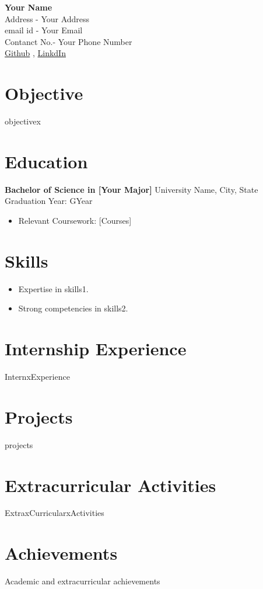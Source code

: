 \documentclass[a4paper,10pt]{article}
\newcommand{\resitem}[2]{
    \textbf{#1} \hfill {#2} \\
}
\begin{document}
\begin{center}
    {\LARGE \textbf{Your Name}} \\[0.2cm]
    Address - Your Address \\
    email id - Your Email \\
    Contanct No.-  Your Phone Number \\
    \href{https://github.com/Github Profile}{Github} , \href{https://www.linkedin.com/in/LinkedIn Profile}{LinkdIn}
\end{center}

\section*{Objective}
objectivex


\section*{Education}
\resitem{Bachelor of Science in [Your Major]}{University Name, City, State \\ Graduation Year: GYear}
\begin{itemize}[left=0pt]
    \item Relevant Coursework: [Courses]
\end{itemize}

\section*{Skills}
\begin{itemize}
    \item Expertise in skills1.
    \item Strong competencies in skills2.
\end{itemize}

\section*{Internship Experience}
InternxExperience

\section*{Projects}
projects

\section*{Extracurricular Activities}
ExtraxCurricularxActivities

\section*{Achievements}
Academic and extracurricular achievements
\end{document}
